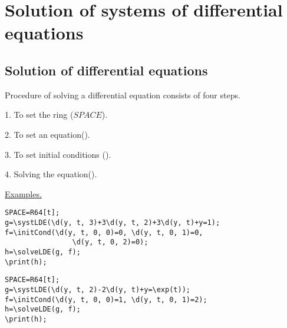 \chapter{Solution of systems of differential equations } 

\section{Solution of differential equations}

Procedure of solving a differential equation consists of four  steps.

1. To set the ring  ($SPACE$).   

2. To set an equation().  

3. To set initial conditions ().  

4. Solving the equation().  

\underline{Examples. }

\vspace*{-2mm}

\begin{verbatim}
SPACE=R64[t]; 
g=\systLDE(\d(y, t, 3)+3\d(y, t, 2)+3\d(y, t)+y=1);
f=\initCond(\d(y, t, 0, 0)=0, \d(y, t, 0, 1)=0, 
                \d(y, t, 0, 2)=0);
h=\solveLDE(g, f);
\print(h);
\end{verbatim}


\begin{verbatim}
SPACE=R64[t]; 
g=\systLDE(\d(y, t, 2)-2\d(y, t)+y=\exp(t));
f=\initCond(\d(y, t, 0, 0)=1, \d(y, t, 0, 1)=2);
h=\solveLDE(g, f);
\print(h);
\end{verbatim}

